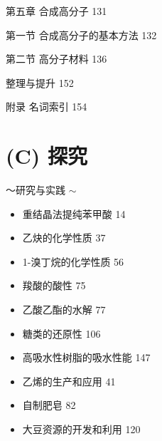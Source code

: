 \documentclass[10pt]{article}
\begin{document}
第五章 合成高分子 131

第一节 合成高分子的基本方法 132

第二节 高分子材料 136

整理与提升 152

附录 名词索引 154

\section*{(C) 探究}

～研究与实践 \(\sim\)

\begin{itemize}
\item 重结晶法提纯苯甲酸 14
\end{itemize}

\begin{itemize}
\item 乙炔的化学性质 37
\end{itemize}

\begin{itemize}
\item 1-溴丁烷的化学性质 56
\end{itemize}

\begin{itemize}
\item 羧酸的酸性 75
\end{itemize}

\begin{itemize}
\item 乙酸乙酯的水解 77
\end{itemize}

\begin{itemize}
\item 糖类的还原性 106
\end{itemize}

\begin{itemize}
\item 高吸水性树脂的吸水性能 147
\end{itemize}

\begin{itemize}
\item 乙烯的生产和应用 41
\end{itemize}

\begin{itemize}
\item 自制肥皂 82
\end{itemize}

\begin{itemize}
\item 大豆资源的开发和利用 120
\end{itemize}
\end{document}
